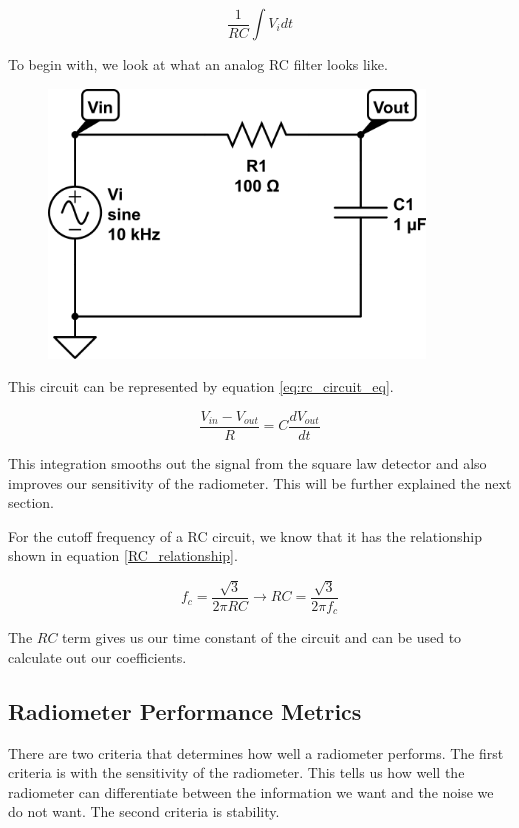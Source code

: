 \begin{equation}\label{eq:rc_int}
\frac{1}{RC}\int{V_idt}
\end{equation}

To begin with, we look at what an analog RC filter looks like. 

{\begin{figure}[h!tb] 
\centering
\includegraphics[width=10cm]{Images/rc-circuit.png}
\label{rc_circuit}
\end{figure}
}

This circuit can be represented by equation \ref{eq:rc_circuit_eq}.

\begin{equation}\label{eq:rc_circuit_eq}
\frac{V_{in}-V_{out}}{R}=C\frac{dV_{out}}{dt}
\end{equation}

This integration smooths out the signal from the square law detector and also improves our sensitivity of the radiometer.  This will be further explained the next section.

For the cutoff frequency of a RC circuit, we know that it has the relationship shown in equation \ref{RC_relationship}.

\begin{equation}\label{RC_relationship}
f_c=\frac{\sqrt{3}}{2\pi RC}\rightarrow RC=\frac{\sqrt{3}}{2\pi f_c}
\end{equation}

The $RC$ term gives us our time constant of the circuit and can be used to calculate out our coefficients. 

\subsection{Radiometer Performance Metrics}
There are two criteria that determines how well a radiometer performs.  The first criteria is with the sensitivity of the radiometer.  This tells us how well the radiometer can differentiate between the information we want and the noise we do not want.  The second criteria is stability.


